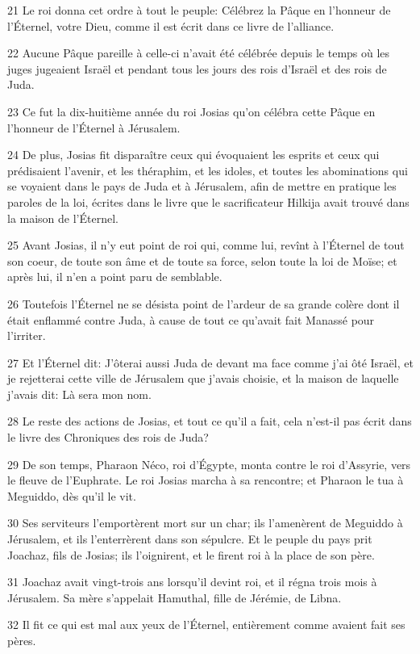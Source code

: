 \par 21 Le roi donna cet ordre à tout le peuple: Célébrez la Pâque en l'honneur de l'Éternel, votre Dieu, comme il est écrit dans ce livre de l'alliance.
\par 22 Aucune Pâque pareille à celle-ci n'avait été célébrée depuis le temps où les juges jugeaient Israël et pendant tous les jours des rois d'Israël et des rois de Juda.
\par 23 Ce fut la dix-huitième année du roi Josias qu'on célébra cette Pâque en l'honneur de l'Éternel à Jérusalem.
\par 24 De plus, Josias fit disparaître ceux qui évoquaient les esprits et ceux qui prédisaient l'avenir, et les théraphim, et les idoles, et toutes les abominations qui se voyaient dans le pays de Juda et à Jérusalem, afin de mettre en pratique les paroles de la loi, écrites dans le livre que le sacrificateur Hilkija avait trouvé dans la maison de l'Éternel.
\par 25 Avant Josias, il n'y eut point de roi qui, comme lui, revînt à l'Éternel de tout son coeur, de toute son âme et de toute sa force, selon toute la loi de Moïse; et après lui, il n'en a point paru de semblable.
\par 26 Toutefois l'Éternel ne se désista point de l'ardeur de sa grande colère dont il était enflammé contre Juda, à cause de tout ce qu'avait fait Manassé pour l'irriter.
\par 27 Et l'Éternel dit: J'ôterai aussi Juda de devant ma face comme j'ai ôté Israël, et je rejetterai cette ville de Jérusalem que j'avais choisie, et la maison de laquelle j'avais dit: Là sera mon nom.
\par 28 Le reste des actions de Josias, et tout ce qu'il a fait, cela n'est-il pas écrit dans le livre des Chroniques des rois de Juda?
\par 29 De son temps, Pharaon Néco, roi d'Égypte, monta contre le roi d'Assyrie, vers le fleuve de l'Euphrate. Le roi Josias marcha à sa rencontre; et Pharaon le tua à Meguiddo, dès qu'il le vit.
\par 30 Ses serviteurs l'emportèrent mort sur un char; ils l'amenèrent de Meguiddo à Jérusalem, et ils l'enterrèrent dans son sépulcre. Et le peuple du pays prit Joachaz, fils de Josias; ils l'oignirent, et le firent roi à la place de son père.
\par 31 Joachaz avait vingt-trois ans lorsqu'il devint roi, et il régna trois mois à Jérusalem. Sa mère s'appelait Hamuthal, fille de Jérémie, de Libna.
\par 32 Il fit ce qui est mal aux yeux de l'Éternel, entièrement comme avaient fait ses pères.
